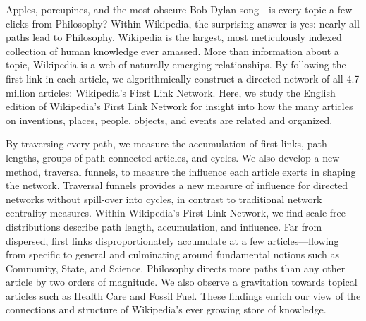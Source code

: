 Apples, porcupines, and the most obscure Bob Dylan song---is every topic a few clicks from Philosophy? 
Within Wikipedia, the surprising answer is yes: nearly all 
paths lead to Philosophy.
Wikipedia is the largest, most meticulously indexed collection of human knowledge ever amassed. 
More than information about a topic, Wikipedia is a web of naturally emerging relationships.  
By following the first link in each article, we algorithmically construct a directed network of 
all 4.7 million articles: Wikipedia's First Link Network.
Here, we study the English edition of Wikipedia's First Link Network for insight into how the many 
articles on inventions, places, people, objects, and events are related and organized.  


By traversing every path, we measure the accumulation of first links, path lengths,
groups of path-connected articles, and cycles.
We also develop a new method, traversal funnels, to measure the influence each article exerts in shaping the network. 
Traversal funnels provides a new measure of influence for directed networks without spill-over into cycles, in contrast to traditional network centrality measures.
Within Wikipedia's First Link Network, we find scale-free distributions describe path length, 
accumulation, and influence. Far from dispersed, first links disproportionately accumulate 
at a few articles---flowing from specific to general and culminating around fundamental notions such as
Community, State, and Science. 
Philosophy directs more paths than any other article by two orders of magnitude. 
We also observe a gravitation towards topical articles such as 
Health Care and Fossil Fuel. 
These findings enrich our view of the connections and structure of
Wikipedia's ever growing store of knowledge.

